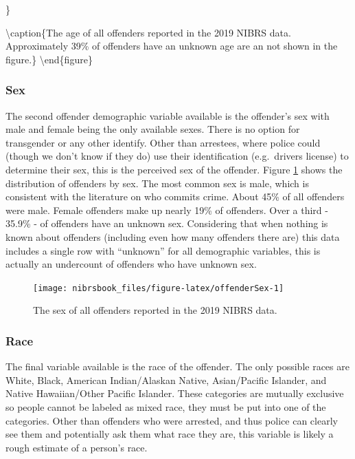 \documentclass[
  12pt,
  openany]{book}
\begin{document}
\}

\textbackslash caption\{The age of all offenders reported in the 2019 NIBRS data. Approximately 39\% of offenders have an unknown age are an not shown in the figure.\}\label{fig:offenderAge}
\textbackslash end\{figure\}

\hypertarget{sex}{%
\subsubsection{Sex}\label{sex}}

The second offender demographic variable available is the offender's sex with male and female being the only available sexes. There is no option for transgender or any other identify. Other than arrestees, where police could (though we don't know if they do) use their identification (e.g.~drivers license) to determine their sex, this is the perceived sex of the offender. Figure \ref{fig:offenderSex} shows the distribution of offenders by sex. The most common sex is male, which is consistent with the literature on who commits crime. About 45\% of all offenders were male. Female offenders make up nearly 19\% of offenders. Over a third - 35.9\% - of offenders have an unknown sex. Considering that when nothing is known about offenders (including even how many offenders there are) this data includes a single row with ``unknown'' for all demographic variables, this is actually an undercount of offenders who have unknown sex.

\begin{figure}

{\centering \texttt{[image: nibrsbook\_files/figure-latex/offenderSex-1]} 

}

\caption{The sex of all offenders reported in the 2019 NIBRS data.}\label{fig:offenderSex}
\end{figure}

\hypertarget{race}{%
\subsubsection{Race}\label{race}}

The final variable available is the race of the offender. The only possible races are White, Black, American Indian/Alaskan Native, Asian/Pacific Islander, and Native Hawaiian/Other Pacific Islander. These categories are mutually exclusive so people cannot be labeled as mixed race, they must be put into one of the categories. Other than offenders who were arrested, and thus police can clearly see them and potentially ask them what race they are, this variable is likely a rough estimate of a person's race.
\end{document}
